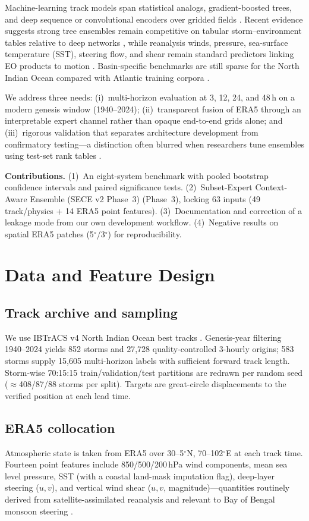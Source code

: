 \documentclass[conference]{IEEEtran}
\newcommand{\secefull}{Subset-Expert Context-Aware Ensemble (SECE v2 Phase~3)}
\newcommand{\bob}{Bay of Bengal}
\newcommand{\era}{ERA5}
\newcommand{\ibtracs}{IBTrACS}
\newcommand{\nstorms}{852}
\newcommand{\nrows}{27{,}728}
\newcommand{\nmhstorms}{583}
\newcommand{\nmhsamples}{15{,}605}
\begin{document}
Machine-learning track models span statistical analogs, gradient-boosted trees, and deep sequence or convolutional encoders over gridded fields \cite{neumann1972,kaplan2003,liu2020,chen2020,wu2018}.
Recent evidence suggests strong tree ensembles remain competitive on tabular storm--environment tables relative to deep networks \cite{grinsztajn2022}, while reanalysis winds, pressure, sea-surface temperature (SST), steering flow, and shear remain standard predictors linking EO products to motion \cite{velden2006,barnes2013,prat2021}.
Basin-specific benchmarks are still sparse for the North Indian Ocean compared with Atlantic training corpora \cite{chan2005,schreck2014}.

We address three needs: (i)~multi-horizon evaluation at 3, 12, 24, and 48\,h on a modern genesis window (1940--2024); (ii)~transparent fusion of \era{} through an interpretable expert channel rather than opaque end-to-end grids alone; and (iii)~rigorous validation that separates architecture development from confirmatory testing---a distinction often blurred when researchers tune ensembles using test-set rank tables \cite{gneiting2014,cawley2010}.

\textbf{Contributions.} (1)~An eight-system benchmark with pooled bootstrap confidence intervals and paired significance tests.
(2)~\secefull{} (Phase~3), locking 63 inputs (49 track/physics + 14 \era{} point features).
(3)~Documentation and correction of a leakage mode from our own development workflow.
(4)~Negative results on spatial \era{} patches (5$^\circ$/3$^\circ$) for reproducibility.

\section{Data and Feature Design}
\subsection{Track archive and sampling}
We use \ibtracs{} v4 North Indian Ocean best tracks \cite{knapp2010,schreck2014}.
Genesis-year filtering 1940--2024 yields \nstorms{} storms and \nrows{} quality-controlled 3-hourly origins; \nmhstorms{} storms supply \nmhsamples{} multi-horizon labels with sufficient forward track length.
Storm-wise 70:15:15 train/validation/test partitions are redrawn per random seed ($\approx$408/87/88 storms per split).
Targets are great-circle displacements to the verified position at each lead time.

\subsection{\era{} collocation}
Atmospheric state is taken from \era{} \cite{hersbach2020} over 30--5$^\circ$N, 70--102$^\circ$E at each track time.
Fourteen point features include 850/500/200\,hPa wind components, mean sea level pressure, SST (with a coastal land-mask imputation flag), deep-layer steering ($u,v$), and vertical wind shear ($u,v$, magnitude)---quantities routinely derived from satellite-assimilated reanalysis and relevant to \bob{} monsoon steering \cite{barnes2013,chan2005,prat2021}.
\end{document}
